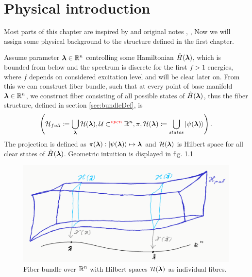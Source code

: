 \chapter{Physical introduction}

Most parts of this chapter are inspired by \citep{kolodrubez} and original notes \citep{berry1984}, \citep{berry1989}, \citep{berry2009}
Now we will assign some physical background to the structure defined in the first chapter.


Assume parameter ${\bm\lambda}\in\mathbb{R}^n$ controlling some Hamiltonian $\hat{H}({\bm\lambda})$, which is bounded from below and the spectrum is discrete for the first $f>1$ energies, where $f$ depends on considered excitation level and will be clear later on. From this we can construct fiber bundle, such that at every point of base manifold ${\bm\lambda}\in \mathbb{R}^n$, we construct fiber consisting of all possible states of $\hat{H}({\bm\lambda})$, thus the fiber structure, defined in section \ref{sec:bundleDef}, is
$$\left(\mathcal{H}_{full}\coloneqq \bigcup_{\bm\lambda} \mathcal{H}({\bm\lambda}),\mathcal{U}\subset^{\textcolor{red}{open}} \mathbb{R}^n,\pi, \mathcal{H}({\bm\lambda}) \coloneqq \bigcup_{states}\ket{\psi({\bm\lambda})}  \right).$$
The projection is defined as $\pi({\bm\lambda}): \ket{\psi({\bm\lambda})}\mapsto {\bm\lambda}$ and $\mathcal{H}({\bm\lambda})$ is Hilbert space for all clear states of $\hat{H}({\bm\lambda})$. 
Geometric intuition is displayed in fig. \ref{fig:wholeBundle}
\begin{figure}[h]
    \centering
    \includegraphics[width=\textwidth]{../img/manifold_basic.png}
\caption{Fiber bundle over $\mathbb{R}^n$ with Hilbert spaces $\mathcal{H}({\bm\lambda})$ as individual fibres.}
    \label{fig:wholeBundle}
\end{figure}

